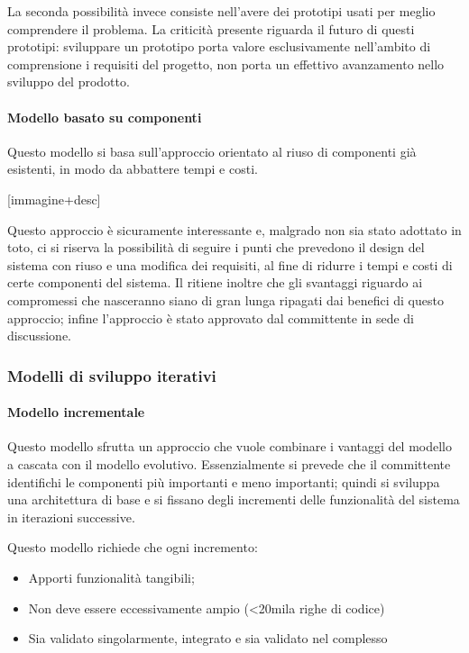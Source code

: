 La seconda possibilità invece consiste nell'avere dei prototipi usati per meglio comprendere il problema. La criticità presente riguarda il futuro di questi prototipi: sviluppare un prototipo porta valore esclusivamente nell'ambito di comprensione i requisiti del progetto, non porta un effettivo avanzamento nello sviluppo del prodotto.

			\paragraph{Modello basato su componenti}
Questo modello si basa sull'approccio orientato al riuso di componenti già esistenti, in modo da abbattere tempi e costi.

[immagine+desc]

Questo approccio è sicuramente interessante e, malgrado non sia stato adottato in toto, ci si riserva la possibilità di seguire i punti che prevedono il design del sistema con riuso e una modifica dei requisiti, al fine di ridurre i tempi e costi di certe componenti del sistema. Il  ritiene inoltre che gli svantaggi riguardo ai compromessi che nasceranno siano di gran lunga ripagati dai benefici di questo approccio; infine l'approccio è stato approvato dal committente in sede di discussione.

		\subsubsection{Modelli di sviluppo iterativi}
			\paragraph{Modello incrementale}
			Questo modello sfrutta un approccio che vuole combinare i vantaggi del modello a cascata con il modello evolutivo. Essenzialmente si prevede che il committente identifichi le componenti più importanti e meno importanti; quindi si sviluppa una architettura di base e si fissano degli incrementi delle funzionalità del sistema in iterazioni successive.

Questo modello richiede che ogni incremento:
\begin{itemize}
\item Apporti funzionalità tangibili;
\item Non deve essere eccessivamente ampio (<20mila righe di codice)
\item Sia validato singolarmente, integrato e sia validato nel complesso
\end{itemize}

